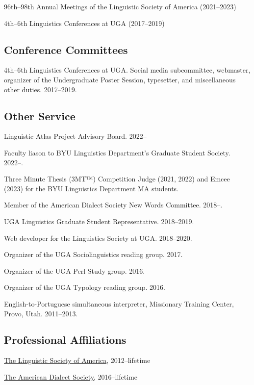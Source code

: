 \documentclass[
]{article}
\begin{document}
96th--98th Annual Meetings of the Linguistic Society of America
(2021--2023)

4th--6th Linguistics Conferences at UGA (2017--2019)

\hypertarget{conference-committees}{%
\subsection{Conference Committees}\label{conference-committees}}

4th--6th Linguistics Conferences at UGA. Social media subcommittee,
webmaster, organizer of the Undergraduate Poster Session, typesetter,
and miscellaneous other duties. 2017--2019.

\hypertarget{other-service}{%
\subsection{Other Service}\label{other-service}}

Linguistic Atlas Project Advisory Board. 2022--

Faculty liason to BYU Linguistics Department's Graduate Student Society.
2022--.

Three Minute Thesis (3MT™) Competition Judge (2021, 2022) and Emcee
(2023) for the BYU Linguistics Department MA students.

Member of the American Dialect Society New Words Committee. 2018--.

UGA Linguistics Graduate Student Representative. 2018--2019.

Web developer for the Linguistics Society at UGA. 2018--2020.

Organizer of the UGA Sociolinguistics reading group. 2017.

Organizer of the UGA Perl Study group. 2016.

Organizer of the UGA Typology reading group. 2016.

English-to-Portuguese simultaneous interpreter, Missionary Training
Center, Provo, Utah. 2011--2013.

\hypertarget{professional-affiliations}{%
\subsection{Professional Affiliations}\label{professional-affiliations}}

\href{http://www.linguisticsociety.org}{The Linguistic Society of
America}, 2012--lifetime

\href{http://www.americandialect.org}{The American Dialect Society},
2016--lifetime
\end{document}
